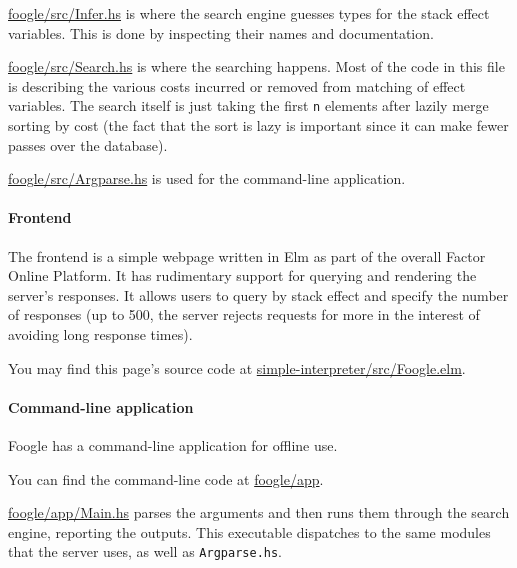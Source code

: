 \documentclass[
]{article}
\begin{document}
\href{https://github.com/factor-hmc/foogle/blob/master/src/Infer.hs}{foogle/src/Infer.hs}
is where the search engine guesses types for the stack effect variables.
This is done by inspecting their names and documentation.

\href{https://github.com/factor-hmc/foogle/blob/master/src/Search.hs}{foogle/src/Search.hs}
is where the searching happens. Most of the code in this file is
describing the various costs incurred or removed from matching of effect
variables. The search itself is just taking the first \texttt{n}
elements after lazily merge sorting by cost (the fact that the sort is
lazy is important since it can make fewer passes over the database).

\href{https://github.com/factor-hmc/foogle/blob/master/src/Argparse.hs}{foogle/src/Argparse.hs}
is used for the command-line application.

\hypertarget{frontend}{%
\paragraph{Frontend}\label{frontend}}

The frontend is a simple webpage written in Elm as part of the overall
Factor Online Platform. It has rudimentary support for querying and
rendering the server's responses. It allows users to query by stack
effect and specify the number of responses (up to 500, the server
rejects requests for more in the interest of avoiding long response
times).

You may find this page's source code at
\href{https://github.com/factor-hmc/simple-interpreter/blob/master/src/Foogle.elm}{simple-interpreter/src/Foogle.elm}.

\hypertarget{command-line-application}{%
\paragraph{Command-line application}\label{command-line-application}}

Foogle has a command-line application for offline use.

You can find the command-line code at
\href{https://github.com/factor-hmc/foogle/blob/master/app}{foogle/app}.

\href{https://github.com/factor-hmc/foogle/blob/master/app/Main.hs}{foogle/app/Main.hs}
parses the arguments and then runs them through the search engine,
reporting the outputs. This executable dispatches to the same modules
that the server uses, as well as \texttt{Argparse.hs}.
\end{document}
